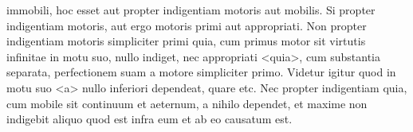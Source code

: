 \documentclass[12pt]{article}
\begin{document}
\pstart 
immobili, hoc esset aut propter indigentiam motoris aut mobilis. Si
propter indigentiam motoris, aut ergo  motoris primi aut
appropriati. Non propter indigentiam motoris simpliciter primi quia,
cum primus motor sit virtutis infinitae in motu suo, nullo indiget,
nec appropriati <quia>, cum 
substantia separata, perfectionem suam
 a motore simpliciter
primo. Videtur igitur quod in motu suo <a> nullo inferiori dependeat,
quare etc. Nec propter indigentiam  quia, cum mobile sit continuum et aeternum, a nihilo dependet,
et maxime non indigebit aliquo quod est infra eum et ab eo causatum
est.  
\pend


\endnumbering
\end{document}
